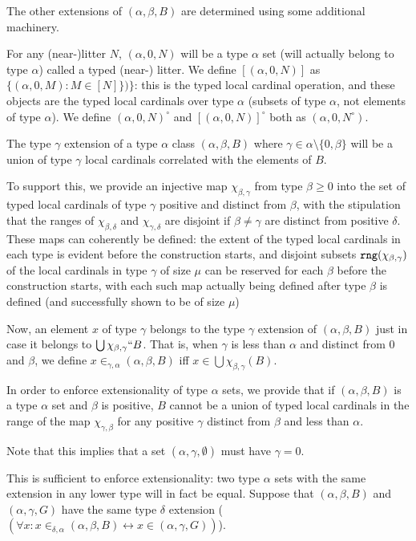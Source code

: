 \documentclass[12pt]{article}
\begin{document}
The other extensions of $(\alpha,\beta,B)$ are determined using some additional machinery.

For any (near-)litter  $N$, $(\alpha,0,N)$ will be a type $\alpha$ set (will actually belong to type $\alpha$) called a typed (near-) litter.  We define $[(\alpha,0,N)]$ as $\{(\alpha,0,M):M \in [N]\})\}$:  this is the typed local cardinal operation,
and these objects are the typed local cardinals over type $\alpha$ (subsets of type $\alpha$, not elements of type $\alpha$).  We define $(\alpha,0,N)^\circ$ and $[(\alpha,0,N)]^\circ$ both as $(\alpha,0,N^\circ)$.

The type $\gamma$ extension of a type $\alpha$ class $(\alpha,\beta,B)$ where $\gamma \in \alpha \setminus \{0,\beta\}$ will be a union of type $\gamma$ local cardinals correlated with the elements of $B$.  

To support this, we provide an injective  map $\chi_{\beta,\gamma}$ from type $\beta \geq 0$ into  the set of typed local cardinals of type $\gamma$ positive and distinct from $\beta$, with the stipulation that the ranges
of $\chi_{\beta,\delta}$ and $\chi_{\gamma,\delta}$ are disjoint if $\beta \neq \gamma$ are distinct from positive $\delta$.  These maps can coherently be defined:  the extent of the typed local cardinals in each type
is evident before the construction starts, and disjoint subsets ${\tt rng}(\chi_{\beta,\gamma})$ of the local cardinals in type $\gamma$ of size $\mu$ can be reserved for each $\beta$ before the construction starts, with each such map actually being defined after type $\beta$ is defined (and successfully shown to be of size $\mu$)

Now, an element $x$ of type $\gamma$ belongs to the type $\gamma$ extension of $(\alpha,\beta,B)$ just in case it belongs to $\bigcup \chi_{\beta,\gamma}``B$.  That is, when $\gamma$ is less than $\alpha$ and distinct from 0 and
$\beta$, we define $x \in_{\gamma,\alpha} (\alpha,\beta,B)$ iff $x \in \bigcup \chi_{\beta,\gamma}(B)$.

In order to enforce extensionality of type $\alpha$ sets, we provide that if $(\alpha,\beta,B)$ is a type $\alpha$ set and $\beta$ is positive, $B$ cannot be a union of typed local cardinals in the range of the  map $\chi_{\gamma,\beta}$ for any positive $\gamma$ distinct from $\beta$ and less than $\alpha$.

Note that this implies that a set $(\alpha,\gamma,\emptyset)$ must have $\gamma=0$.

This is sufficient to enforce extensionality:  two type $\alpha$ sets with the same extension in any lower type will in fact be equal.  Suppose that $(\alpha,\beta,B)$ and $(\alpha,\gamma,G)$ have the same type $\delta$ extension ($(\forall x:x \in_{\delta,\alpha} 
(\alpha,\beta,B)\leftrightarrow x \in (\alpha,\gamma,G))$).
\end{document}
